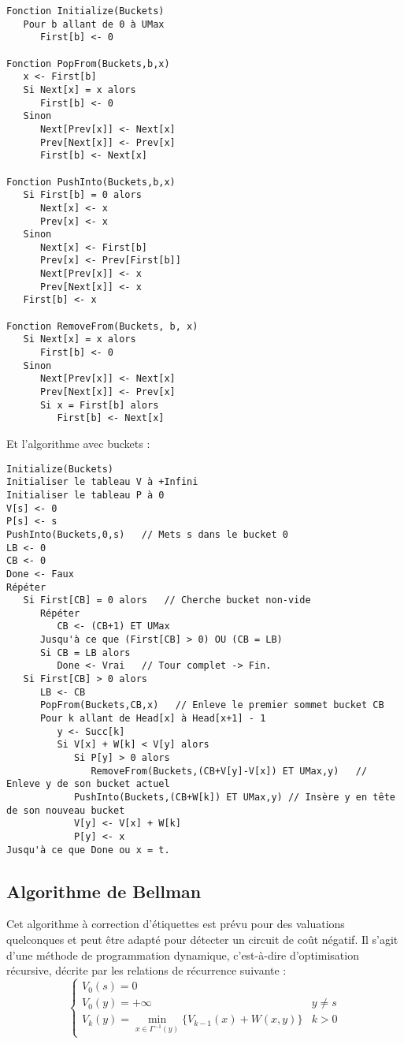 \documentclass{article}
\begin{document}
\begin{verbatim}
Fonction Initialize(Buckets)
   Pour b allant de 0 à UMax
      First[b] <- 0
      
Fonction PopFrom(Buckets,b,x)
   x <- First[b]
   Si Next[x] = x alors
      First[b] <- 0
   Sinon
      Next[Prev[x]] <- Next[x]
      Prev[Next[x]] <- Prev[x]
      First[b] <- Next[x]

Fonction PushInto(Buckets,b,x)
   Si First[b] = 0 alors
      Next[x] <- x
      Prev[x] <- x
   Sinon
      Next[x] <- First[b]
      Prev[x] <- Prev[First[b]]
      Next[Prev[x]] <- x
      Prev[Next[x]] <- x
   First[b] <- x
   
Fonction RemoveFrom(Buckets, b, x)
   Si Next[x] = x alors
      First[b] <- 0
   Sinon
      Next[Prev[x]] <- Next[x]
      Prev[Next[x]] <- Prev[x]
      Si x = First[b] alors 
         First[b] <- Next[x]
\end{verbatim}
\newpage
\noindent Et l'algorithme avec buckets :

\begin{verbatim}
Initialize(Buckets)
Initialiser le tableau V à +Infini
Initialiser le tableau P à 0
V[s] <- 0
P[s] <- s
PushInto(Buckets,0,s)   // Mets s dans le bucket 0
LB <- 0
CB <- 0
Done <- Faux
Répéter
   Si First[CB] = 0 alors   // Cherche bucket non-vide
      Répéter
         CB <- (CB+1) ET UMax
      Jusqu'à ce que (First[CB] > 0) OU (CB = LB)
      Si CB = LB alors
         Done <- Vrai   // Tour complet -> Fin.
   Si First[CB] > 0 alors
      LB <- CB
      PopFrom(Buckets,CB,x)   // Enleve le premier sommet bucket CB
      Pour k allant de Head[x] à Head[x+1] - 1
         y <- Succ[k]
         Si V[x] + W[k] < V[y] alors
            Si P[y] > 0 alors
               RemoveFrom(Buckets,(CB+V[y]-V[x]) ET UMax,y)   // Enleve y de son bucket actuel
            PushInto(Buckets,(CB+W[k]) ET UMax,y) // Insère y en tête de son nouveau bucket
            V[y] <- V[x] + W[k]
            P[y] <- x
Jusqu'à ce que Done ou x = t.
\end{verbatim}

\subsection{Algorithme de Bellman}

Cet algorithme à correction d’étiquettes est prévu pour des valuations quelconques et peut être adapté pour détecter un circuit de coût négatif. Il s’agit d’une méthode de 
programmation dynamique, c’est-à-dire d’optimisation récursive, décrite par les relations de récurrence suivante :
\[
\left\{\begin{array}{ll}
V_0(s) = 0 \\
V_0(y) = +\infty &  y \neq s \\
V_k(y) = \min_{x\in \Gamma^{-1}(y)} \{ V_{k-1}(x) +W(x,y)\} & k> 0
\end{array}\right.
\]
\end{document}
